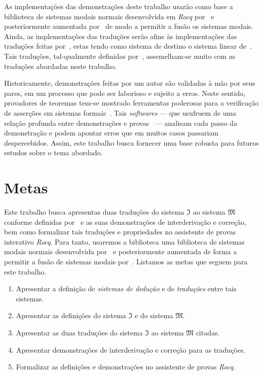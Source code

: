     \vspace{.5\baselineskip}
    As implementações das demonstrações deste trabalho usarão como base a biblioteca de sistemas modais normais desenvolvida em \emph{Rocq} por~\cite{Silveira+others.2022} e posteriormente aumentada por~\cite{Nunes+others.2025} de modo a permitir a fusão os sistemas modais.
    Ainda, as implementações das traduções serão afins às implementações das traduções feitas por~\cite{Sehnem.2023}, estas tendo como sistema de destino o sistema linear de~\cite{Girard.1987}.
    Tais traduções, tal-qualmente definidas por~\cite{Girard.1987}, assemelham-se muito com as traduções abordadas neste trabalho.

    \vspace{.5\baselineskip}
    Historicamente, demonstrações feitas por um autor são validadas à mão por seus pares, em um processo que pode ser laborioso e sujeito a erros.
    Neste sentido, provadores de teoremas tem-se mostrado ferramentas poderosas para a verificação de asserções em sistemas formais~\citep{Chlipala.2013}.
    Tais \emph{softwares} --- que usufruem de uma relação profunda entre demonstrações e provas~\citep{Wadler.2015} --- analisam cada passo da demonstração e podem apontar erros que em muitos casos passariam despercebidos.
    Assim, este trabalho busca fornecer uma base robusta para futuros estudos sobre o tema abordado.

    \section{Metas}
    Este trabalho busca apresentas duas traduções do sistema $\mathfrak{I}$ ao sistema $\mathfrak{M}$ conforme definidas por~\cite{Troelstra+Schwichtenberg.2000} e as suas demonstrações de interderivação e correção, bem como formalizar tais traduções e propriedades no assistente de provas interativo \emph{Rocq}.
    Para tanto, usaremos a biblioteca uma biblioteca de sistemas modais normais desenvolvida por~\cite{Silveira+others.2022} e posteriormente aumentada de forma a permitir a fusão de sistemas modais por~\cite{Nunes+others.2025}.
    Listamos as metas que seguem para este trabalho.

    \begin{enumerate}[label=\textbf{{(\alph*)}}, left=\parindent]
        \item Apresentar a definição de \emph{sistemas de dedução} e de \emph{traduções} entre tais sistemas.
        \item Apresentar as definições do sistema $\mathfrak{I}$ e do sistema $\mathfrak{M}$.
        \item Apresentar as duas traduções do sistema $\mathfrak{I}$ ao sistema $\mathfrak{M}$ citadas.
        \item Apresentar demonstrações de interderivação e correção para as traduções.
        \item Formalizar as definições e demonstrações no assistente de provas \emph{Rocq}.
    \end{enumerate}

